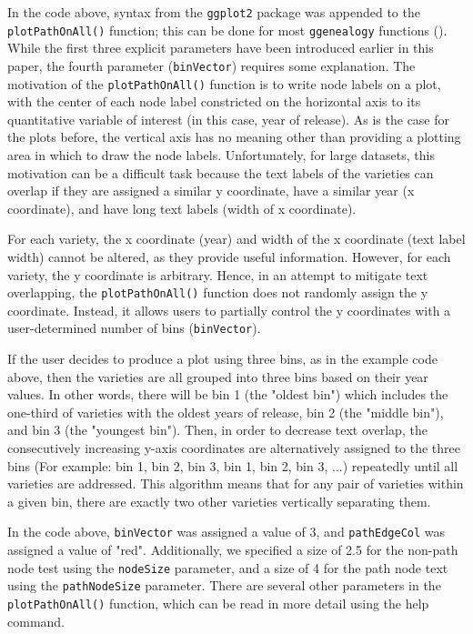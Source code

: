 \documentclass[11pt,a4paper,oldfontcommands,openany]{memoir}
\numberwithin{equation}{section} %
\newcommand{\code}[1]{{\texttt{#1}}}
\newcommand{\pkg}[1]{{\texttt{#1}}}
\begin{document}
In the code above, syntax from the \pkg{ggplot2} package was appended to the \code{plotPathOnAll()} function; this can be done for most \pkg{ggenealogy} functions (\citealt{ggplot2}). While the first three explicit parameters have been introduced earlier in this paper, the fourth parameter (\code{binVector}) requires some explanation. The motivation of the \code{plotPathOnAll()} function is to write node labels on a plot, with the center of each node label constricted on the horizontal axis to its quantitative variable of interest (in this case, year of release). As is the case for the plots before, the vertical axis has no meaning other than providing a plotting area in which to draw the node labels. Unfortunately, for large datasets, this motivation can be a difficult task because the text labels of the varieties can overlap if they are assigned a similar y coordinate, have a similar year (x coordinate), and have long text labels (width of x coordinate).

For each variety, the x coordinate (year) and width of the x coordinate (text label width) cannot be altered, as they provide useful information. However, for each variety, the y coordinate is arbitrary. Hence, in an attempt to mitigate text overlapping, the \code{plotPathOnAll()} function does not randomly assign the y coordinate. Instead, it allows users to partially control the y coordinates with a user-determined number of bins (\code{binVector}).

If the user decides to produce a plot using three bins, as in the example code above, then the varieties are all grouped into three bins based on their year values. In other words, there will be bin 1 (the "oldest bin") which includes the one-third of varieties with the oldest years of release, bin 2 (the "middle bin"), and bin 3 (the "youngest bin"). Then, in order to decrease text overlap, the consecutively increasing y-axis coordinates are alternatively assigned to the three bins (For example: bin 1, bin 2, bin 3, bin 1, bin 2, bin 3, ...) repeatedly until all varieties are addressed. This algorithm means that for any pair of varieties within a given bin, there are exactly two other varieties vertically separating them.

In the code above, \code{binVector} was assigned a value of 3, and \code{pathEdgeCol} was assigned a value of "red". Additionally, we specified a size of 2.5 for the non-path node test using the \code{nodeSize} parameter, and a size of 4 for the path node text using the \code{pathNodeSize} parameter. There are several other parameters in the \code{plotPathOnAll()} function, which can be read in more detail using the help command.
\end{document}
